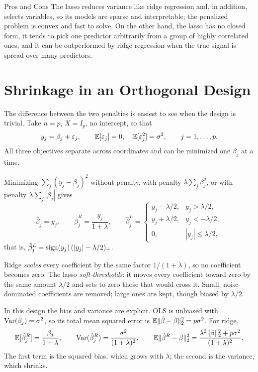 \begin{notebox}{Pros and Cons}
The lasso reduces variance like ridge regression and, in addition, selects variables, so its models are sparse and interpretable; the penalized problem is convex and fast to solve. On the other hand, the lasso has no closed form, it tends to pick one predictor arbitrarily from a group of highly correlated ones, and it can be outperformed by ridge regression when the true signal is spread over many predictors.
\end{notebox}

\section{Shrinkage in an Orthogonal Design}\label{sec:shrinkage-toy}

The difference between the two penalties is easiest to see when the design is trivial. Take $n=p$, $X=I_p$, no intercept, so that
\[
y_j=\beta_j+\varepsilon_j,\qquad \mathbb{E}[\varepsilon_j]=0,\quad \mathbb{E}[\varepsilon_j^2]=\sigma^2,\qquad j=1,\dots,p .
\]
All three objectives separate across coordinates and can be minimized one $\beta_j$ at a time.

\begin{proposition}[OLS, Ridge and Lasso for $X=I$]\label{prop:orthogonal-shrinkage}
Minimizing $\sum_j(y_j-\beta_j)^2$ without penalty, with penalty $\lambda\sum_j\beta_j^2$, or with penalty $\lambda\sum_j|\beta_j|$ gives
\[
\hat\beta_j=y_j,\qquad
\hat\beta^R_j=\frac{y_j}{1+\lambda},\qquad
\hat\beta^L_j=\begin{cases}y_j-\lambda/2,& y_j>\lambda/2,\\ y_j+\lambda/2,& y_j<-\lambda/2,\\ 0,& |y_j|\le\lambda/2,\end{cases}
\]
that is, $\hat\beta^L_j=\operatorname{sign}(y_j)\,(|y_j|-\lambda/2)_+$.
\end{proposition}

Ridge \emph{scales} every coefficient by the same factor $1/(1+\lambda)$, so no coefficient becomes zero. The lasso \emph{soft-thresholds}: it moves every coefficient toward zero by the same amount $\lambda/2$ and sets to zero those that would cross it. Small, noise-dominated coefficients are removed; large ones are kept, though biased by $\lambda/2$.

In this design the bias and variance are explicit. OLS is unbiased with $\operatorname{Var}(\hat\beta_j)=\sigma^2$, so its total mean squared error is $\mathbb{E}\lVert \hat\beta-\beta\rVert_2^2=p\sigma^2$. For ridge,
\[
\mathbb{E}[\hat\beta^R_j]=\frac{\beta_j}{1+\lambda},\qquad \operatorname{Var}(\hat\beta^R_j)=\frac{\sigma^2}{(1+\lambda)^2},\qquad
\mathbb{E}\lVert \hat\beta^R-\beta\rVert_2^2=\frac{\lambda^2\lVert \beta\rVert_2^2+p\sigma^2}{(1+\lambda)^2}.
\]
The first term is the squared bias, which grows with $\lambda$; the second is the variance, which shrinks.

